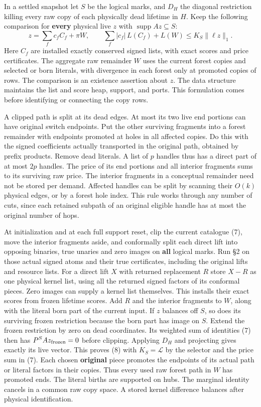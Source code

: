 \documentclass[11pt]{article}
\begin{document}
In a settled snapshot let \(S\) be the logical marks, and \(D_H\) the diagonal restriction killing every raw copy of each physically dead lifetime in \(H\). Keep the following comparison for \textbf{every} physical live \(z\) with \(\operatorname{supp}Az\subseteq S\):
\[
 z=\sum_f c_f C_f+\pi W,\qquad
 \sum_f |c_f|\,L(C_f)+L(W)\le K_S\|\ell z\|_1 .
\tag{8}
\]
Here \(C_f\) are installed exactly conserved signed lists, with exact scores and price certificates. The aggregate raw remainder \(W\) uses the current forest copies and selected or born literals, with divergence in each forest only at promoted copies of rows. The comparison is an existence assertion about \(z\). The data structure maintains the list and score heap, support, and ports. This formulation comes before identifying or connecting the copy rows.

A clipped path is split at its dead edges. At most its two live end portions can have original switch endpoints. Put the other surviving fragments into a forest remainder with endpoints promoted at holes in all affected copies. Do this with the signed coefficients actually transported in the original path, obtained by prefix products. Remove dead literals. A list of \(p\) handles thus has a direct part of at most \(2p\) handles. The price of its end portions and all interior fragments sums to its surviving raw price. The interior fragments in a conceptual remainder need not be stored per demand. Affected handles can be split by scanning their \(O(k)\) physical edges, or by a forest hole index. This rule works through any number of cuts, since each retained subpath of an original eligible handle has at most the original number of hops.

At initialization and at each full support reset, clip the current catalogue (7), move the interior fragments aside, and conformally split each direct lift into opposing binaries, true unaries and zero images on \textbf{all} logical marks. Run §2 on those actual signed atoms and their true certificates, including the original lifts and resource lists. For a direct lift \(X\) with returned replacement \(R\) store \(X-R\) as one physical kernel list, using all the returned signed factors of its conformal pieces. Zero images can supply a kernel list themselves. This installs their exact scores from frozen lifetime scores. Add \(R\) and the interior fragments to \(W\), along with the literal born part of the current input. If \(z\) balances off \(S\), so does its surviving frozen restriction because the born part has image on \(S\). Extend the frozen restriction by zero on dead coordinates. Its weighted sum of identities (7) then has \(P^S Az_{\rm frozen}=0\) before clipping. Applying \(D_H\) and projecting gives exactly its live vector. This proves (8) with \(K_S=\mathcal L\) by the selector and the price sum in (7). Each chosen \textbf{original} piece promotes the endpoints of its actual path or literal factors in their copies. Thus every used raw forest path in \(W\) has promoted ends. The literal births are supported on hubs. The marginal identity cancels in a common raw copy space. A stored kernel difference balances after physical identification.
\end{document}
